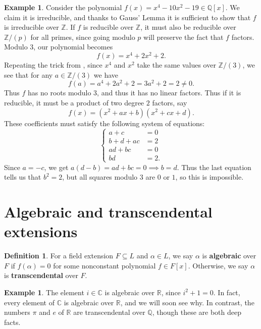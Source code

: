 \documentclass[12pt]{report}
\numberwithin{equation}{section}
\numberwithin{theorem}{chapter}
\theoremstyle{definition}
\newtheorem{definition}[theorem]{Definition}
\newtheorem{example}[theorem]{Example}
\newtheorem*{basic properties}{Basic Properties}
\newtheorem*{Important Remark}{Important Remark}
\newcommand{\df}[1]{{\bf #1}\index{#1}}
\newcommand{\R}{\mathbb{R}}
\newcommand{\Z}{\mathbb{Z}}
\newcommand{\Q}{\mathbb{Q}}
\newcommand{\C}{\mathbb{C}}
\begin{document}
\begin{example}
	Consider the polynomial $f(x) = x^4-10x^2-19 \in \Q[x]$. We claim it is irreducible, and thanks to Gauss' Lemma it is sufficient to show that $f$ is irreducible over $\Z$. If $f$ is reducible over $\Z$, it must also be reducible over $\Z/(p)$ for all primes, since going modulo $p$ will preserve the fact that $f$ factors. Modulo $3$, our polynomial becomes
	 $$f(x) = x^4+2x^2+2.$$
	 Repeating the trick from , since $x^4$ and $x^2$ take the same values over $\Z/(3)$, we see that for any $a \in \Z/(3)$ we have
	  $$f(a) = a^4+2a^2+2 = 3a^2+2=2 \neq 0.$$
	Thus $f$ has no roots modulo $3$, and thus it has no linear factors. Thus if it is reducible, it must be a product of two degree $2$ factors, say
	$$f(x) = (x^2+ax+b)(x^2+cx+d).$$
These coefficients must satisfy the following system of equations:
$$\left\lbrace
\begin{array}{ll}
	a+c & = 0 \\
	b+d+ac & = 2 \\
	ad+bc & = 0 \\
	bd & = 2.
\end{array}
\right.$$
Since $a=-c$, we get $a(d-b)=ad+bc = 0 \implies b=d$. Thus the last equation tells us that $b^2=2$, but all squares modulo $3$ are $0$ or $1$, so this is impossible.
\end{example}







\section{Algebraic and transcendental extensions}

\begin{definition}
For a field extension $F \subseteq L$ and $\alpha \in L$, we say $\alpha$ is \df{algebraic} over $F$ if $f(\alpha) = 0$ for some nonconstant polynomial $f \in F[x]$. Otherwise, we say $\alpha$ is \df{transcendental} over $F$.
\end{definition}

\begin{example}
The element $i \in \C$ is algebraic over $\R$, since $i^2+1=0$. In fact, every element of $\C$ is algebraic over $\R$, and we will soon see why. In contrast, the numbers $\pi$ and $e$ of $\R$ are transcendental over $\Q$, though these are both deep facts.
\end{example}
\end{document}
